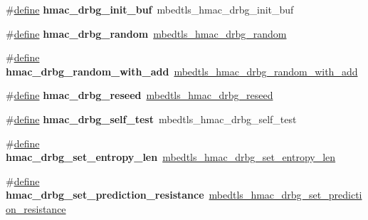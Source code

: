 \begin{DoxyCompactItemize}
\mbox{\label{compat-1_83_8h_a9ce3b346130833e98ec88489360ee812}} 
\#\hyperlink{structdefine}{define} {\bfseries hmac\+\_\+drbg\+\_\+init\+\_\+buf}~mbedtls\+\_\+hmac\+\_\+drbg\+\_\+init\+\_\+buf
\item 
\mbox{\label{compat-1_83_8h_a8359cbb0be9ba5e40fb08ed26e0002d1}} 
\#\hyperlink{structdefine}{define} {\bfseries hmac\+\_\+drbg\+\_\+random}~\hyperlink{hmac__drbg_8h_aa66cb34019161010448c7e915a972ee6}{mbedtls\+\_\+hmac\+\_\+drbg\+\_\+random}
\item 
\mbox{\label{compat-1_83_8h_a2d4ed9853285bcfe6c4edcde0f9539b2}} 
\#\hyperlink{structdefine}{define} {\bfseries hmac\+\_\+drbg\+\_\+random\+\_\+with\+\_\+add}~\hyperlink{hmac__drbg_8h_a8829c0b3f094edf8cc144c7185536cd8}{mbedtls\+\_\+hmac\+\_\+drbg\+\_\+random\+\_\+with\+\_\+add}
\item 
\mbox{\label{compat-1_83_8h_aaecb40e8b200bb1ff9583adc5171fdea}} 
\#\hyperlink{structdefine}{define} {\bfseries hmac\+\_\+drbg\+\_\+reseed}~\hyperlink{hmac__drbg_8h_a0bc680c3d03de1a82170a3831617b8cf}{mbedtls\+\_\+hmac\+\_\+drbg\+\_\+reseed}
\item 
\mbox{\label{compat-1_83_8h_aa15d07d636a9cac05487b865434399a6}} 
\#\hyperlink{structdefine}{define} {\bfseries hmac\+\_\+drbg\+\_\+self\+\_\+test}~mbedtls\+\_\+hmac\+\_\+drbg\+\_\+self\+\_\+test
\item 
\mbox{\label{compat-1_83_8h_a20a7744da9ec324bf1cf6b87eedb8b91}} 
\#\hyperlink{structdefine}{define} {\bfseries hmac\+\_\+drbg\+\_\+set\+\_\+entropy\+\_\+len}~\hyperlink{hmac__drbg_8h_a6a396cfe0ab81e07dd676ff75163b474}{mbedtls\+\_\+hmac\+\_\+drbg\+\_\+set\+\_\+entropy\+\_\+len}
\item 
\mbox{\label{compat-1_83_8h_ac6ead7e76deb1292991020a1589e3dac}} 
\#\hyperlink{structdefine}{define} {\bfseries hmac\+\_\+drbg\+\_\+set\+\_\+prediction\+\_\+resistance}~\hyperlink{hmac__drbg_8h_a0a874c42e24bd02c9805be58b3f04083}{mbedtls\+\_\+hmac\+\_\+drbg\+\_\+set\+\_\+prediction\+\_\+resistance}
\item 
\mbox{\label{compat-1_83_8h_a087bcd6c0c56adb9504dd3c99fe7ef10}} 

\end{DoxyCompactItemize}

